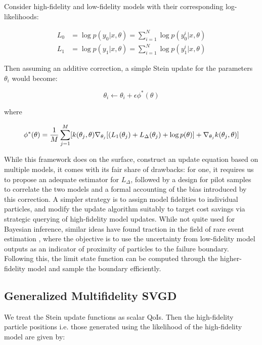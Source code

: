 \documentclass[12pt]{article}
\renewcommand{\[}{\left[}
\renewcommand{\]}{\right]}
\renewcommand{\(}{\left(}
\renewcommand{\)}{\right)}
\newcommand{\grad}[1]{\nabla #1}
\begin{document}
Consider high-fidelity and low-fidelity models with their corresponding log-likelihoods:

\begin{align}
 L_0 &= \log p(y_0 | x, \theta) = \sum_{i=1}^{N} \log p(y_0^i | x, \theta) \\
 L_1 &= \log p(y_1 | x, \theta) = \sum_{i=1}^{N} \log p(y_1^i | x, \theta)
\end{align}


Then assuming an additive correction, a simple Stein update for the parameters $\theta_i$ would become:

\begin{equation}
    \theta_i \leftarrow \theta_i + \epsilon \phi^{\ast}(\theta)
\end{equation}

where 

\begin{equation}
    \phi^{\ast}(\theta) = \frac{1}{M}\sum_{j=1}^{M}[k(\theta_j, \theta) \grad_{\theta_j}[(L_{1}(\theta_j) + L_{\Delta}(\theta_j) + \log p(\theta)] + \grad_{\theta_j} k(\theta_j, \theta)]
\end{equation}

While this framework does on the surface, construct an update equation based on multiple models, it comes with its fair share of drawbacks: for one, it requires us to propose an adequate estimator for $L_{\Delta}$, followed by a design for pilot samples to correlate the two models and a formal accounting of the bias introduced by this correction. 
A simpler strategy is to assign model fidelities to individual particles, and modify the update algorithm suitably to target cost savings via strategic querying of high-fidelity model updates. While not quite used for Bayesian inference, similar ideas have found traction in the field of rare event estimation \cite{dhulipala_bayesian_2022}, where the objective is to use the uncertainty from low-fidelity model outputs as an indicator of proximity of particles to the failure boundary. Following this, the limit state function can be computed through the higher-fidelity model and sample the boundary efficiently.

\subsection{Generalized Multifidelity SVGD}

We treat the Stein update functions as scalar QoIs. Then the high-fidelity particle positions i.e. those generated using the likelihood of the high-fidelity model are given by:
\end{document}
